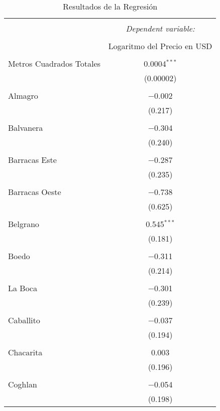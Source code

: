 
\begin{table}[!htbp] \centering 
  \caption{Resultados de la Regresión} 
  \label{tab:resultados_regresion} 
\begin{tabular}{@{\extracolsep{5pt}}lc} 
\\[-1.8ex]\hline 
\hline \\[-1.8ex] 
 & \multicolumn{1}{c}{\textit{Dependent variable:}} \\ 
\cline{2-2} 
\\[-1.8ex] & Logaritmo del Precio en USD \\ 
\hline \\[-1.8ex] 
 Metros Cuadrados Totales & 0.0004$^{***}$ \\ 
  & (0.00002) \\ 
  & \\ 
 Almagro & $-$0.002 \\ 
  & (0.217) \\ 
  & \\ 
 Balvanera & $-$0.304 \\ 
  & (0.240) \\ 
  & \\ 
 Barracas Este & $-$0.287 \\ 
  & (0.235) \\ 
  & \\ 
 Barracas Oeste & $-$0.738 \\ 
  & (0.625) \\ 
  & \\ 
 Belgrano & 0.545$^{***}$ \\ 
  & (0.181) \\ 
  & \\ 
 Boedo & $-$0.311 \\ 
  & (0.214) \\ 
  & \\ 
 La Boca & $-$0.301 \\ 
  & (0.239) \\ 
  & \\ 
 Caballito & $-$0.037 \\ 
  & (0.194) \\ 
  & \\ 
 Chacarita & 0.003 \\ 
  & (0.196) \\ 
  & \\ 
 Coghlan & $-$0.054 \\ 
  & (0.198) \\ 

\end{tabular}
\end{table}
